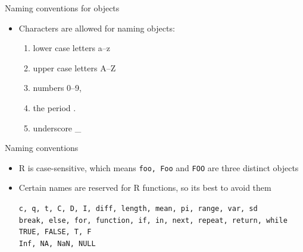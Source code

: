 \documentclass[11pt]{beamer}\usepackage[]{graphicx}\usepackage[]{color}
\newcommand{\code}[1]{\texttt{#1}}
\begin{document}
\begin{frame}[fragile]{Naming conventions for objects}
\begin{itemize}
  \setlength\itemsep{2em}
\item Characters are allowed for naming objects: 
\begin{enumerate}
\item lower case letters a–z 
\item upper case letters A–Z
\item numbers 0–9, 
\item the period .
\item underscore \_
\end{enumerate}
\end{itemize}

\end{frame}


\begin{frame}[fragile]{Naming conventions}
\begin{itemize}
  \setlength\itemsep{2em}
\item R is case-sensitive, which means \code{foo, Foo} and \code{FOO} are three distinct objects
\pause \item Certain names are reserved for R functions, so its best to avoid them
\begin{center}
\code{c, q, t, C, D, I, diff, length, mean, pi, range, var, sd}\\
\code{break, else, for, function, if, in, next, repeat, return, while}\\
\code{TRUE, FALSE, T, F}\\
\code{Inf, NA, NaN, NULL}
\end{center}
\end{itemize}

\end{frame}
\end{document}
